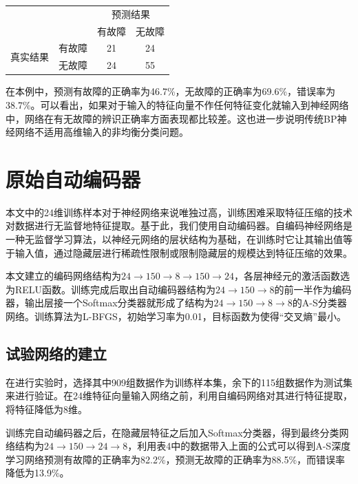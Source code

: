 \documentclass{ctacn}%
\begin{document}
\begin{multicols}{2}
\begin{center}
	\label{tab:3}
	\begin{tabular} {cccc}\toprule
		\multirow{2}{*}[-2pt]{}&\multirow{2}{*}[-2pt]{}&\multicolumn{2}{c}{预测结果}\\
		\cmidrule(lr){3-4}
		&&有故障&无故障\\\hline
		\multirow{2}{*}[-2pt]{真实结果}&有故障&21&24\\
		&无故障&24&55\\
		\bottomrule
\end{tabular}\end{center}

在本例中，预测有故障的正确率为46.7\%，无故障的正确率为69.6\%，错误率为38.7\%。可以看出，如果对于输入的特征向量不作任何特征变化就输入到神经网络中，网络在有无故障的辨识正确率方面表现都比较差。这也进一步说明传统BP神经网络不适用高维输入的非均衡分类问题。

\section{原始自动编码器}

本文中的24维训练样本对于神经网络来说唯独过高，训练困难采取特征压缩的技术对数据进行无监督地特征提取。基于此，我们使用自动编码器。自编码神经网络是一种无监督学习算法，以神经元网络的层状结构为基础，在训练时它让其输出值等于输入值，通过隐藏层进行稀疏性限制或限制隐藏层的规模达到特征压缩的效果。

本文建立的编码网络结构为$24\rightarrow150\rightarrow8\rightarrow150\rightarrow24$，各层神经元的激活函数选为RELU函数。训练完成后取出自动编码器结构为$24\rightarrow150\rightarrow8$的前一半作为编码器，输出层接一个Softmax分类器就形成了结构为$24\rightarrow150\rightarrow8\rightarrow8$的A-S分类器网络。训练算法为L-BFGS，初始学习率为0.01，目标函数为使得“交叉熵”最小。

\subsection{试验网络的建立}

在进行实验时，选择其中909组数据作为训练样本集，余下的115组数据作为测试集来进行验证。在24维特征向量输入网络之前，利用自编码网络对其进行特征提取，将特征降低为8维。

训练完自动编码器之后，在隐藏层特征之后加入Softmax分类器，得到最终分类网络结构为$24\rightarrow150\rightarrow24\rightarrow8$，利用表4中的数据带入上面的公式可以得到A-S深度学习网络预测有故障的正确率为82.2\%，预测无故障的正确率为88.5\%，而错误率降低为13.9\%。


\end{multicols}
\end{document}
